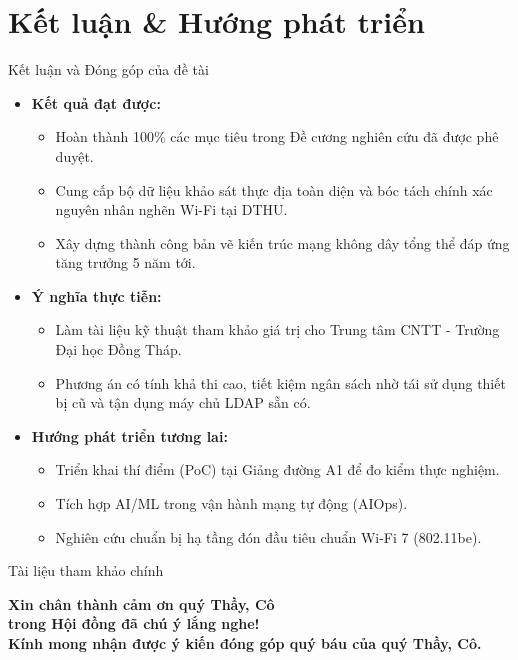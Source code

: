 \documentclass[fleqn]{beamer}
\begin{document}
\section{Kết luận \& Hướng phát triển}

\begin{frame}{Kết luận và Đóng góp của đề tài}
  \begin{itemize}
    \item \textbf{Kết quả đạt được:}
      \begin{itemize}\small
        \item Hoàn thành 100\% các mục tiêu trong Đề cương nghiên cứu đã được phê duyệt.
        \item Cung cấp bộ dữ liệu khảo sát thực địa toàn diện và bóc tách chính xác nguyên nhân nghẽn Wi-Fi tại DTHU.
        \item Xây dựng thành công bản vẽ kiến trúc mạng không dây tổng thể đáp ứng tăng trưởng 5 năm tới.
      \end{itemize}
    \item \textbf{Ý nghĩa thực tiễn:}
      \begin{itemize}\small
        \item Làm tài liệu kỹ thuật tham khảo giá trị cho Trung tâm CNTT - Trường Đại học Đồng Tháp.
        \item Phương án có tính khả thi cao, tiết kiệm ngân sách nhờ tái sử dụng thiết bị cũ và tận dụng máy chủ LDAP sẵn có.
      \end{itemize}
    \item \textbf{Hướng phát triển tương lai:}
      \begin{itemize}\small
        \item Triển khai thí điểm (PoC) tại Giảng đường A1 để đo kiểm thực nghiệm.
        \item Tích hợp AI/ML trong vận hành mạng tự động (AIOps).
        \item Nghiên cứu chuẩn bị hạ tầng đón đầu tiêu chuẩn Wi-Fi 7 (802.11be).
      \end{itemize}
  \end{itemize}
\end{frame}

\begin{frame}{Tài liệu tham khảo chính}
  \nocite{cisco2021wlan, dthu2026hientrang, kurose2021computer, khorov2019tutorial, gast2005wireless, pahlavan2020principles}
  \printbibliography
\end{frame}

\begin{frame}
  \centering
  \Large\bfseries
  Xin chân thành cảm ơn quý Thầy, Cô\\ trong Hội đồng đã chú ý lắng nghe!\\[1cm]
  \normalsize Kính mong nhận được ý kiến đóng góp quý báu của quý Thầy, Cô.
\end{frame}
\end{document}
